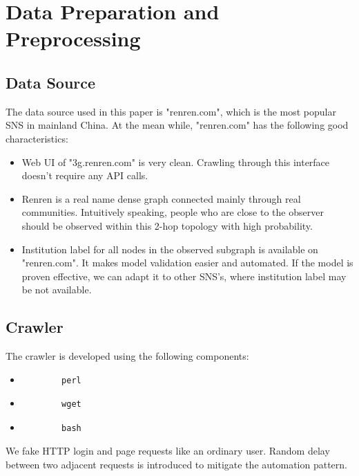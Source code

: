 \documentclass[11pt,a4paper]{article}
\begin{document}
\section{Data Preparation and Preprocessing}

\subsection{Data Source}

The data source used in this paper is "renren.com", which is the 
most popular SNS in mainland China. At the mean while, "renren.com" 
has the following good characteristics:
\begin{itemize}
	\item Web UI of "3g.renren.com" is very clean. Crawling through
	this interface doesn't require any API calls.  
	\item Renren is a real name dense graph connected mainly through 
	real communities. Intuitively speaking, 
	people who are close to the observer should be observed within 
	this 2-hop topology with high probability. 
	\item Institution label for all nodes in the observed subgraph
	is available on "renren.com". It makes model validation easier
	and automated. If the model is proven effective, we can adapt 
	it to other SNS's, where institution label may be not available.  
\end{itemize}

\subsection{Crawler}

The crawler is developed using the following components:
\begin{itemize}
	\item \begin{verbatim}
		perl
	\end{verbatim}
	\item \begin{verbatim}
		wget
	\end{verbatim}
	\item \begin{verbatim}
		bash
	\end{verbatim}
\end{itemize}

We fake HTTP login and page requests like an ordinary user. 
Random delay between two adjacent requests is introduced 
to mitigate the automation pattern. 
\end{document}
